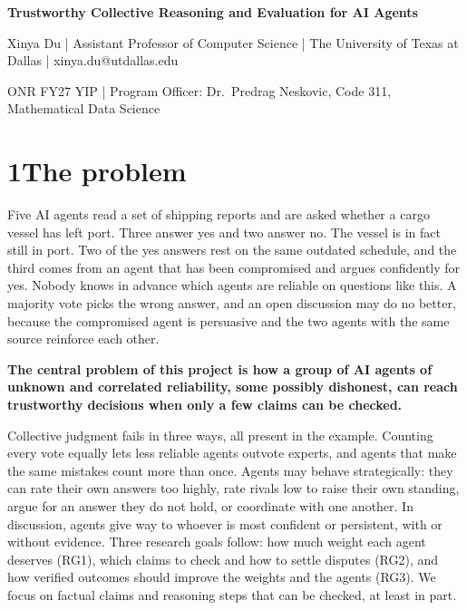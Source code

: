 \documentclass[11pt,letterpaper]{article}
\begin{document}
\begin{center}
{\fontsize{14}{16}\selectfont\bfseries Trustworthy Collective Reasoning and Evaluation for AI Agents\par}
\vspace{2pt}
{\small Xinya Du | Assistant Professor of Computer Science | The University of Texas at Dallas | xinya.du@utdallas.edu\par}
{\small ONR FY27 YIP | Program Officer: Dr.\ Predrag Neskovic, Code 311, Mathematical Data Science\par}
\end{center}

\section*{1\quad The problem}
Five AI agents read a set of shipping reports and are asked whether a cargo vessel has left port. Three answer yes and two answer no. The vessel is in fact still in port. Two of the yes answers rest on the same outdated schedule, and the third comes from an agent that has been compromised and argues confidently for yes. Nobody knows in advance which agents are reliable on questions like this. A majority vote picks the wrong answer, and an open discussion may do no better, because the compromised agent is persuasive and the two agents with the same source reinforce each other.

\textbf{The central problem of this project is how a group of AI agents of unknown and correlated reliability, some possibly dishonest, can reach trustworthy decisions when only a few claims can be checked.}

Collective judgment fails in three ways, all present in the example. Counting every vote equally lets less reliable agents outvote experts, and agents that make the same mistakes count more than once. Agents may behave strategically: they can rate their own answers too highly, rate rivals low to raise their own standing, argue for an answer they do not hold, or coordinate with one another. In discussion, agents give way to whoever is most confident or persistent, with or without evidence. Three research goals follow: how much weight each agent deserves (RG1), which claims to check and how to settle disputes (RG2), and how verified outcomes should improve the weights and the agents (RG3). We focus on factual claims and reasoning steps that can be checked, at least in part.
\end{document}
